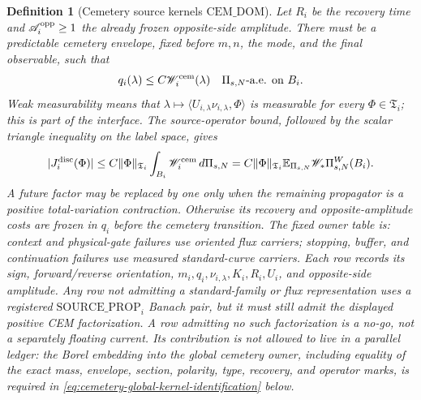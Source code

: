\documentclass[11pt]{article}
\newtheorem{definition}[theorem]{Definition}
\begin{document}
\begin{definition}[Cemetery source kernels
$\mathrm{CEM\_DOM}$]
Let $R_i$ be the recovery time and
$\mathscr A_i^{\rm opp}\ge1$ the already frozen opposite-side amplitude.
There must be a predictable cemetery envelope, fixed before $m,n$, the mode,
and the final observable, such that
\begin{equation}
\label{eq:cemetery-kernel-domination}
 q_i(\lambda)\le C\mathscr W_i^{\rm cem}(\lambda)
 \quad\Pi_{s,N}\text{-a.e. on }B_i.
\end{equation}
Weak measurability means that
$\lambda\mapsto\langle U_{i,\lambda}\nu_{i,\lambda},\Phi\rangle$
is measurable for every $\Phi\in\mathfrak T_i$; this is part of the
interface.  The source-operator bound, followed by the scalar triangle
inequality on the label space, gives
\begin{equation}
\label{eq:cemetery-current-weighted-bound}
 |J_i^{\rm disc}(\Phi)|
 \le C\|\Phi\|_{\mathfrak T_i}
       \int_{B_i}\mathscr W_i^{\rm cem}\,d\Pi_{s,N}
 =C\|\Phi\|_{\mathfrak T_i}
   \mathbb E_{\Pi_{s,N}}\mathscr W_*\Pi_{s,N}^{W}(B_i).
\end{equation}
A future factor may be replaced by one only when the remaining propagator is
a positive total-variation contraction.  Otherwise its recovery and
opposite-amplitude costs are frozen in $q_i$ before the cemetery transition.
The fixed owner table is: context and physical-gate failures use oriented
flux carriers; stopping, buffer, and continuation failures use measured
standard-curve carriers.  Each row records its sign, forward/reverse
orientation, $m_i,q_i,\nu_{i,\lambda},K_i,R_i,U_i$, and opposite-side
amplitude.
Any row not admitting a standard-family or flux representation uses a
registered $\mathrm{SOURCE\_PROP}_i$ Banach pair, but it must still admit
the displayed positive CEM factorization.  A row admitting no such
factorization is a no-go, not a separately floating current.
Its contribution is not allowed to live in a parallel ledger:
the Borel embedding into the global cemetery owner, including equality of
the exact mass, envelope, section, polarity, type, recovery, and operator
marks, is required in 
\eqref{eq:cemetery-global-kernel-identification} below.
\end{definition}
\end{document}
